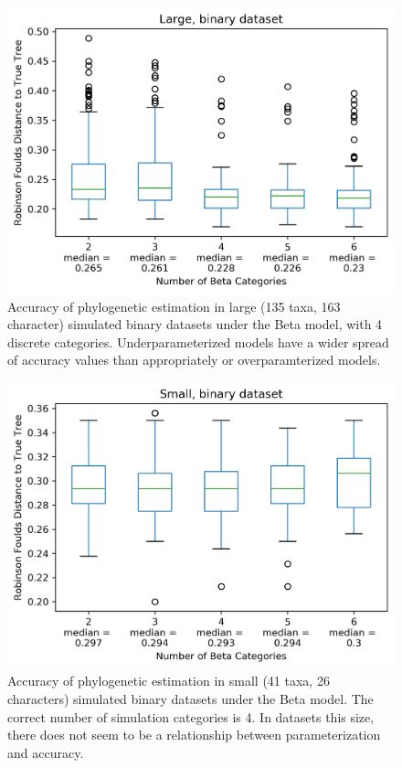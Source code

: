 \documentclass[]{article}
\begin{document}
\begin{figure}
  \caption{Accuracy of phylogenetic estimation in large (135 taxa, 163 character) simulated binary datasets under the Beta model, with 4 discrete categories. Underparameterized models have a wider spread of accuracy values than appropriately or overparamterized models.} 
    \includegraphics{fig/LargeBinary}
\end{figure} 


\begin{figure}
  \caption{Accuracy of phylogenetic estimation in small (41 taxa, 26 characters) simulated binary datasets under the Beta model. The correct number of simulation categories is 4. In datasets this size, there does not seem to be a relationship between parameterization and accuracy. } 
    \includegraphics{fig/SmallBinary}
\end{figure} 
\end{document}
